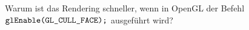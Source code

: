 \documentclass[../../main.tex]{subfiles}
\begin{document}
Warum ist das Rendering schneller, wenn in OpenGL der Befehl $\texttt{glEnable(GL\_CULL\_FACE);}$ ausgeführt wird?
\end{document}
